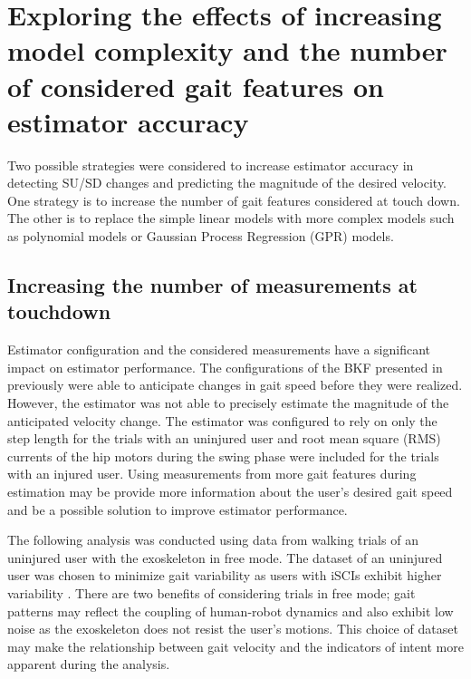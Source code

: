 \section{Exploring the effects of increasing model complexity and the number of considered gait features on estimator accuracy}

Two possible strategies were considered to increase estimator accuracy in detecting SU/SD changes and predicting the magnitude of the desired velocity. One strategy is to increase the number of gait features considered at touch down. The other is to replace the simple linear models with more complex models such as polynomial models or Gaussian Process Regression (GPR) models.

\subsection{Increasing the number of measurements at touchdown}
Estimator configuration and the considered measurements have a significant impact on estimator performance. The configurations of the BKF presented in previously were able to anticipate changes in gait speed before they were realized. However, the estimator was not able to precisely estimate the magnitude of the anticipated velocity change. The estimator was configured to rely on only the step length for the trials with an uninjured user and root mean square (RMS) currents of the hip motors during the swing phase were included for the trials with an injured user. Using measurements from more gait features during estimation may be provide more information about the user's desired gait speed and be a possible solution to improve estimator performance.

The following analysis was conducted using data from walking trials of an uninjured user with the exoskeleton in free mode. The dataset of an uninjured user was chosen to minimize gait variability as users with iSCIs exhibit higher variability \cite{sohn2018variability}. There are two benefits of considering trials in free mode; gait patterns may reflect the coupling of human-robot dynamics and also exhibit low noise as the exoskeleton does not resist the user's motions. This choice of dataset may make the relationship between gait velocity and the indicators of intent more apparent during the analysis. 

